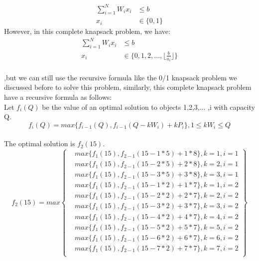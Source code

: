 \documentclass{article}
\begin{document}
		\begin{align*}
	\sum_{i = 1}^{N} W_{i}x_i &\leq b\\
	x_i &\in\{0,1\}
	\end{align*}
	However, in this complete knapsack problem, we have:\\
		\begin{align*}
\sum_{i = 1}^{N} W_{i}x_i &\leq b\\
x_i &\in\{0,1, 2, ... , \lfloor \frac{b}{a_i} \rfloor \}
\end{align*}
	\\
	,but we can still use the recursive formula like the 0/1 knapsack problem we discussed before to solve this problem, similarly, this complete knapsack problem have a recursive formula as follows:\\
	Let $f_{i}(Q)$ be the value of an optimal solution to objects 1,2,3,... ,i with capacity Q.\\
	$$f_{i}(Q) = max\{f_{i-1}(Q), f_{i - 1}(Q - kW_i) + kP_i\}, 1 \leq kW_i \leq Q$$\\
	The optimal solution is $f_{2}(15)$.\\
	$$
	f_{2}(15) = max \left\{
	\begin{aligned}
	 & max\{f_{1}(15), f_{2 - 1}(15 - 1*5) + 1 * 8 \}, k = 1, i = 1\\
	 & max\{f_{1}(15), f_{2 - 1}(15 - 2*5)  + 2 * 8\}, k = 2, i = 1\\
	 & max\{f_{1}(15), f_{2 - 1}(15 - 3*5) + 3 * 8\}, k = 3, i = 1\\
	 & max\{f_{1}(15), f_{2 - 1}(15 - 1*2) + 1 * 7  \}, k = 1, i = 2\\
	 & max\{f_{1}(15), f_{2 - 1}(15 - 2*2) + 2 * 7 \}, k = 2, i = 2\\
	& max\{f_{1}(15), f_{2 - 1}(15 - 3*2) + 3 * 7\}, k = 3, i = 2\\
	 & max\{f_{1}(15), f_{2 - 1}(15 - 4*2)+ 4 * 7 \}, k = 4, i = 2\\
	 & max\{f_{1}(15), f_{2 - 1}(15 - 5*2)+ 5 * 7 \}, k = 5, i = 2\\
	 & max\{f_{1}(15), f_{2 - 1}(15 - 6*2)+ 6 * 7 \}, k = 6, i = 2\\
	 & max\{f_{1}(15), f_{2 - 1}(15 - 7*2)+ 7 * 7 \}, k = 7, i = 2\\
	\end{aligned}
	\right\}
	$$
\end{document}
